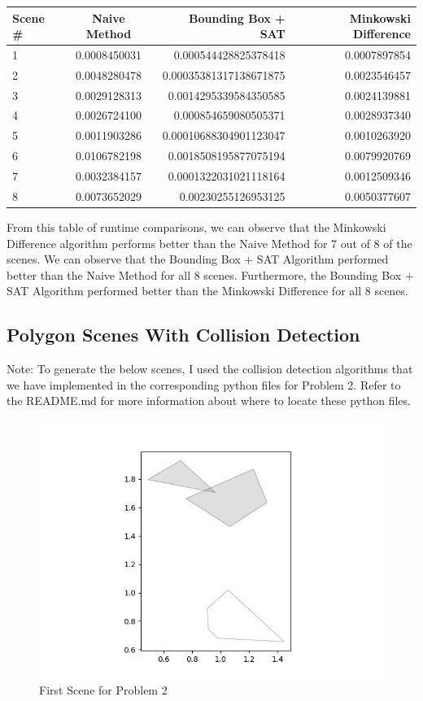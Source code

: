 \documentclass{article}
\begin{document}
\begin{tabular}{|l|c|r|r|}
  \hline
  Scene \# & Naive Method & Bounding Box + SAT & Minkowski Difference \\
  \hline
  1 & 0.0008450031 & 0.000544428825378418 & 0.0007897854 \\
2 & 0.0048280478 & 0.00035381317138671875 & 0.0023546457 \\
3 & 0.0029128313 & 0.0014295339584350585 & 0.0024139881 \\
4 & 0.0026724100 & 0.000854659080505371 & 0.0028937340 \\
5 & 0.0011903286 & 0.00010688304901123047 & 0.0010263920 \\
6 & 0.0106782198 & 0.0018508195877075194 & 0.0079920769 \\
7 & 0.0032384157 & 0.0001322031021118164 & 0.0012509346 \\
8 & 0.0073652029 & 0.00230255126953125 & 0.0050377607 \\
  \hline
\end{tabular} \newline 

From this table of runtime comparisons, we can observe that the Minkowski Difference algorithm performs better than the Naive Method for 7 out of 8 of the scenes. We can observe that the Bounding Box + SAT Algorithm performed better than the Naive Method for all 8 scenes. Furthermore, the Bounding Box + SAT Algorithm performed better than the Minkowski Difference for all 8 scenes. 

\newpage 
\subsection{Polygon Scenes With Collision Detection} 

Note: To generate the below scenes, I used the collision detection algorithms that we have implemented in the corresponding python files for Problem 2. Refer to the README.md for more information about where to locate these python files. 

\begin{figure}[h!]
	\includegraphics[width= 0.9 \linewidth]{Problem2_scene1.jpg}
	\centering
	\caption{First Scene for Problem 2}
	\label{Problem2_scene1.jpg}
\end{figure}
\end{document}
